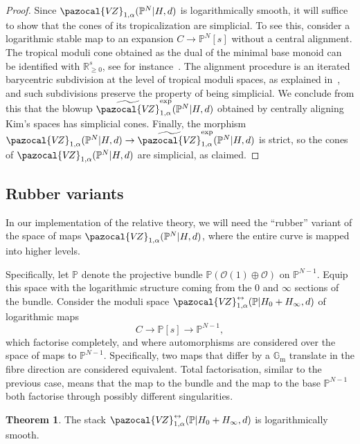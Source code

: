 \documentclass[11pt]{amsart}
\newcommand{\VZ}{\pazocal{V\!Z}}
\renewcommand{\to}{\rightarrow}
\theoremstyle{definition}
\newtheorem{thm}{Theorem}[section]
\theoremstyle{definition}
\begin{document}
\begin{proof}
Since $\VZ_{1,\alpha}(\mathbb P^N|H,d)$ is logarithmically smooth, it will suffice to show that the cones of its tropicalization are simplicial. To see this, consider a logarithmic stable map to an expansion $C\to \mathbb P^N[s]$ without a central alignment. The tropical moduli cone obtained as the dual of the minimal base monoid can be identified with $\mathbb R_{\geq 0}^{s}$, see for instance~\cite[Section~2.2]{ChenDegeneration}. The alignment procedure is an iterated barycentric subdivision at the level of tropical moduli spaces, as explained in~\cite[Section 4.6]{RSPW}, and such subdivisions preserve the property of being simplicial. We conclude from this that the blowup $\widetilde{\VZ}^{\mathrm{exp}}_{1,\alpha}(\mathbb P^N|H,d)$ obtained by centrally aligning Kim's spaces has simplicial cones. Finally, the morphism $\VZ_{1,\alpha}(\mathbb P^N|H,d)\to \widetilde{\VZ}^{\mathrm{exp}}_{1,\alpha}(\mathbb P^N|H,d)$ is strict, so the cones of $\VZ_{1,\alpha}(\mathbb P^N|H,d)$ are simplicial, as claimed.
\end{proof}

\subsection{Rubber variants}\label{subsection rubber} In our implementation of the relative theory, we will need the ``rubber'' variant of the space of maps $
\VZ_{1,\alpha}(\mathbb P^N|H,d)$, where the entire curve is mapped into higher levels. 

Specifically, let $\mathbb P$ denote the projective bundle $\mathbb P(\mathcal O(1)\oplus\mathcal O)$ on $\mathbb P^{N-1}$. Equip this space with the logarithmic structure coming from the $0$ and $\infty$ sections of the bundle. Consider the moduli space $\VZ^{\leftrightarrow}_{1,\alpha}(\mathbb P|H_0+H_\infty,d)$ of logarithmic maps
\[
C\to \mathbb P[s]\to \mathbb P^{N-1},
\]
which factorise completely, and where automorphisms are considered over the space of maps to $\mathbb P^{N-1}$. Specifically, two maps that differ by a $\mathbb G_{\operatorname{m}}$ translate in the fibre direction are considered equivalent. Total factorisation, similar to the previous case, means that the map to the bundle and the map to the base $\mathbb P^{N-1}$ both factorise through possibly different singularities. 

\begin{thm}\label{thm rubber log smooth}
The stack $\VZ^{\leftrightarrow}_{1,\alpha}(\mathbb P|H_0+H_\infty,d)$ is logarithmically smooth.
\end{thm}
\end{document}
